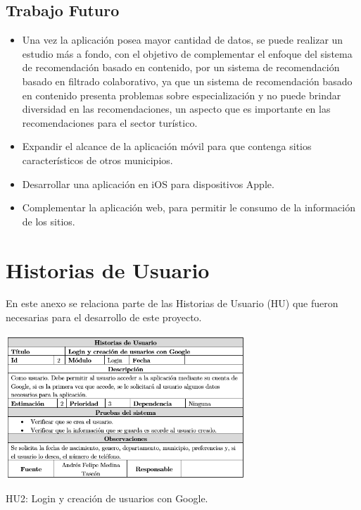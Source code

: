 \documentclass[12pt,letterpaper,openany]{book}
\begin{document}
\section{Trabajo Futuro}
\begin{itemize}
\item Una vez la aplicación posea mayor cantidad de datos, se puede realizar un estudio más a fondo, con el objetivo de complementar el enfoque del sistema de recomendación basado en contenido, por un sistema de recomendación basado en filtrado colaborativo, ya que un sistema de recomendación basado en contenido presenta problemas sobre especialización y no puede brindar diversidad en las recomendaciones, un aspecto que es importante en las recomendaciones para el sector turístico.
\item Expandir el alcance de la aplicación móvil para que contenga sitios característicos de otros municipios.
\item Desarrollar una aplicación en iOS para dispositivos Apple.
\item Complementar la aplicación web, para permitir le consumo de la información de los sitios.
\end{itemize}


\appendix
\chapter{Historias de Usuario}\label{aped.A}
En este anexo se relaciona parte de las Historias de Usuario (HU) que fueron necesarias para el desarrollo de este proyecto.	
\begin{table}[H]
\centering
\includegraphics[width=9cm]{./imagenes/HU/HU2}
\caption{HU2: Login y creación de usuarios con Google.}
\end{table}
\end{document}
